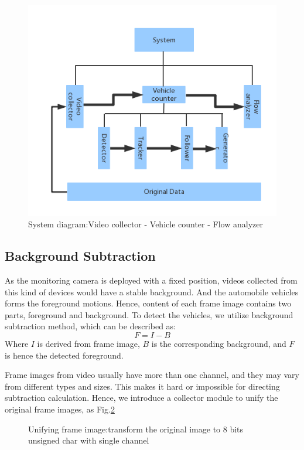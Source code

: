 \documentclass[draftclsnofoot,onecolumn]{IEEEtran}
\begin{document}
	\begin{figure}[!ht]
	\centering
	\includegraphics[width=0.4\linewidth]{diagram1.png} 
	\caption{System diagram:Video collector - Vehicle counter - Flow analyzer}
	\label{fig:sysDiagram}
	\end{figure}
	
	
	\subsection{Background Subtraction}
	As the monitoring camera is deployed with a fixed position, videos collected from this kind of devices would have a stable background. And the automobile vehicles forms the foreground motions. Hence, content of each frame image contains two parts, foreground and background. To detect the vehicles, we utilize background subtraction method, which can be described as:
	\begin{equation}
	F = I  - B
	\label{eq:backgroundSubtraction}
	\end{equation}
	Where $I$ is derived from frame image, $B$ is the corresponding background, and $F$ is hence the detected foreground.
	
	Frame images from video usually have more than one channel, and they may vary from different types and sizes. This makes it hard or impossible for directing subtraction calculation. Hence, we introduce a collector module to unify the original frame images, as Fig.\ref{fig:unifyDiagram}
	\begin{figure}[!h]
	\centering
	\caption{Unifying frame image:transform the original image to 8 bits unsigned char with single channel}
	\label{fig:unifyDiagram}
	\end{figure}
	
\end{document}
